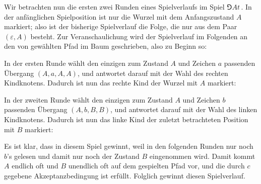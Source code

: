 \documentclass[fontsize=11pt, twoside=false, numbers=autoenddot]{scrbook}
\begin{document}
Wir betrachten nun die ersten zwei Runden eines Spielverlaufs
im Spiel $\Game{A}{t}$\,.
In der anfänglichen Spielposition ist nur die Wurzel mit dem Anfangszustand $A$ markiert;
also ist der bisherige Spielverlauf die Folge, die nur aus dem Paar
$(\varepsilon,A)$ besteht. Zur Veranschaulichung wird der Spielverlauf
im Folgenden an den von \PF gewählten Pfad im Baum geschrieben, also
zu Beginn so:
%
\begin{center}
\end{center}
%
In der ersten Runde wählt \AUT den einzigen zum Zustand $A$ und Zeichen $a$
passenden Übergang $(A,a,A,A)$,
und \PF antwortet darauf mit der Wahl des rechten Kindknotens.
Dadurch ist nun das rechte Kind der Wurzel mit $A$ markiert:
%
\begin{center}
\end{center}
%
In der zweiten Runde wählt \AUT den einzigen zum Zustand $A$ und Zeichen $b$
passenden Übergang $(A,b,B,B)$,
und \PF antwortet darauf mit der Wahl des linken Kindknotens.
Dadurch ist nun das linke Kind der zuletzt betrachteten Position mit $B$ markiert:
%
\begin{center}
\end{center}
%
Es ist klar, dass in diesem Spiel \AUT gewinnt, weil in den folgenden Runden nur noch
$b$'s gelesen und damit nur noch der Zustand $B$ eingenommen wird.
Damit kommt $A$ endlich oft und $B$ unendlich oft auf dem gespielten Pfad vor,
und die durch $c$ gegebene Akzeptanzbedingung ist erfüllt. Folglich gewinnt \AUT
diesen Spielverlauf.
\end{document}
